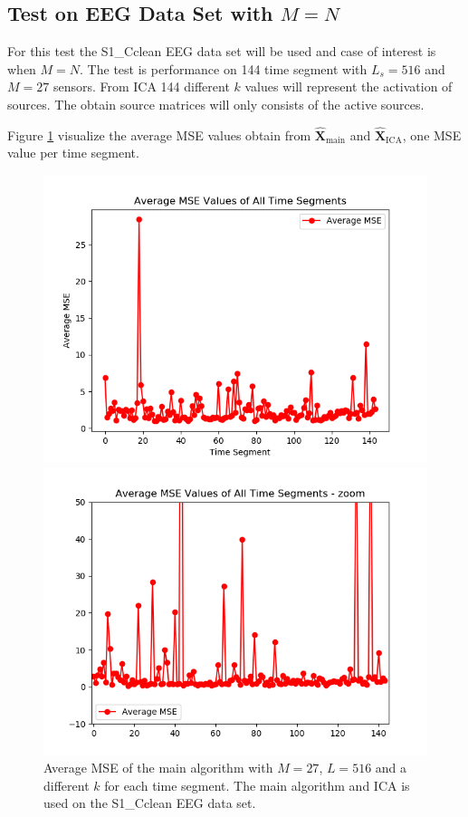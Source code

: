 \subsection{Test on EEG Data Set with $M=N$}
For this test the S1\_Cclean EEG data set will be used and case of interest is when $M = N$. The test is performance on 144 time segment with $L_s = 516$ and $M = 27$ sensors. From ICA 144 different $k$ values will represent the activation of sources. The obtain source matrices will only consists of the active sources.

Figure \ref{fig:M=N_1} visualize the average MSE values obtain from $\hat{\mathbf{X}}_{\text{main}}$ and $\hat{\mathbf{X}}_{\text{ICA}}$, one MSE value per time segment.
\begin{figure}[H]
    \begin{minipage}[t]{.45\textwidth}
		\centering
		\includegraphics[scale=0.5]{figures/ch_7/AveMSE_M=N.png}
	\caption{Average MSE of the main algorithm with $M=27$, $L = 516$ and a different $k$ for each time segment. The main algorithm and ICA is used on the S1\_Cclean EEG data set.}
	\label{fig:M=N_1}
    \end{minipage} 
    \hfill
    \begin{minipage}[t]{.45\textwidth}
        \centering
		\includegraphics[scale=0.5]{figures/ch_7/AveMSE_M=N_zoom.png}

\end{minipage}
\end{figure}
